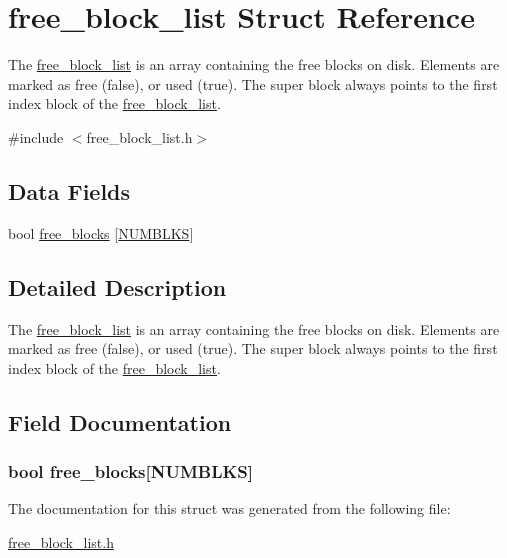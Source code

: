 \hypertarget{structfree__block__list}{\section{free\-\_\-block\-\_\-list Struct Reference}
\label{structfree__block__list}
}


The \hyperlink{structfree__block__list}{free\-\_\-block\-\_\-list} is an array containing the free blocks on disk. Elements are marked as free (false), or used (true). The super block always points to the first index block of the \hyperlink{structfree__block__list}{free\-\_\-block\-\_\-list}.  




{\ttfamily \#include $<$free\-\_\-block\-\_\-list.\-h$>$}

\subsection*{Data Fields}
\begin{DoxyCompactItemize}
\item 
bool \hyperlink{structfree__block__list_afc18ca7178c4649e347e2bc5d69eb89c}{free\-\_\-blocks} \mbox{[}\hyperlink{glob__data_8h_a1a26eed02f4dee88f68eb825c8ace393}{N\-U\-M\-B\-L\-K\-S}\mbox{]}
\end{DoxyCompactItemize}


\subsection{Detailed Description}
The \hyperlink{structfree__block__list}{free\-\_\-block\-\_\-list} is an array containing the free blocks on disk. Elements are marked as free (false), or used (true). The super block always points to the first index block of the \hyperlink{structfree__block__list}{free\-\_\-block\-\_\-list}. 

\subsection{Field Documentation}
\hypertarget{structfree__block__list_afc18ca7178c4649e347e2bc5d69eb89c}{
\subsubsection[{free\-\_\-blocks}]{\setlength{\rightskip}{0pt plus 5cm}bool free\-\_\-blocks\mbox{[}{\bf N\-U\-M\-B\-L\-K\-S}\mbox{]}}}\label{structfree__block__list_afc18ca7178c4649e347e2bc5d69eb89c}


The documentation for this struct was generated from the following file\-:\begin{DoxyCompactItemize}
\item 
\hyperlink{free__block__list_8h}{free\-\_\-block\-\_\-list.\-h}\end{DoxyCompactItemize}
